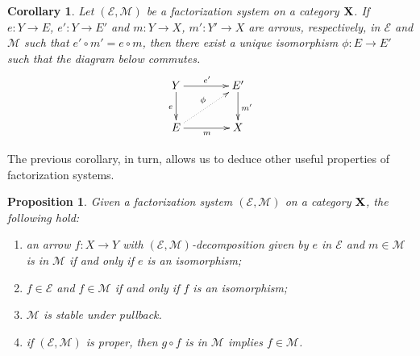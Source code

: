 \documentclass[a4paper]{article}
\def\X{\textbf {\textup{X}}}
\newtheorem{proposition}[theorem]{Proposition}
\newtheorem{corollary}[theorem]{Corollary}
\theoremstyle{definition}
\begin{document}
\begin{corollary}\label{prop:iso}
	Let $(\mathcal{E}, \mathcal{M})$ be a factorization system on a category $\X$. If $e\colon Y\to E$, $e'\colon Y\to E'$ and $m\colon Y\to X$, $m'\colon Y'\to X $ are arrows, respectively, in $\mathcal{E}$ and $\mathcal{M}$ such that
	$e'\circ m'=e\circ m$,  then  there exist a unique isomorphism $\phi\colon E \rightarrow E'$ such that the diagram below commutes.
	\[\xymatrix@C=40pt{Y \ar[r]^{e'} \ar[d]_{e}& E' \ar[d]^{m'}\\ E \ar[r]_{m} \ar@{.>}[ur]^{\phi}& X}\]
\end{corollary}

The previous corollary, in turn, allows us to deduce other useful properties of factorization systems.

\begin{proposition}\label{cor:iso} Given a factorization system $(\mathcal{E}, \mathcal{M})$ on a category $\X$, the following hold:
	\begin{enumerate}
		\item an arrow $f\colon X\to Y$ with $(\mathcal{E}, \mathcal{M})$-decomposition given by $e$ in $\mathcal{E}$ and $m\in \mathcal{M}$ is in $\mathcal{M}$ if and only if $e$ is an isomorphism;
		\item $f\in \mathcal{E}$ and $f\in \mathcal{M}$ if and only if $f$ is an isomorphism;
		\item $\mathcal{M}$ is stable under pullback.
		\item  if $(\mathcal{E}, \mathcal{M})$ is proper, then $g\circ f$ is in $\mathcal{M}$ implies $f\in \mathcal{M}$.
	\end{enumerate}
\end{proposition}
\end{document}
